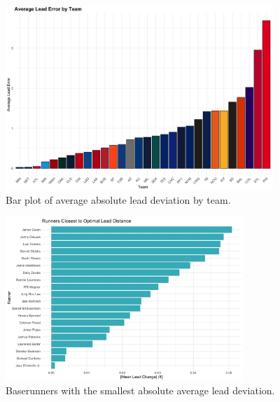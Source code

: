 \documentclass[12pt,letterpaper]{article}
\begin{document}
\begin{figure}[!htbp]
    \centering
    \includegraphics[width=0.9\textwidth]{figures/team-lead-error.png}
    \caption{Bar plot of average absolute lead deviation by team.}
    \label{fig:deviation_by_team}
\end{figure}

\begin{figure}[!htbp]
    \centering
    \includegraphics[width=0.8\textwidth]{figures/runners-closest.jpeg}
    \caption{Baserunners with the smallest absolute average lead deviation.}
    \label{fig:runners_closest}
\end{figure}
\end{document}

